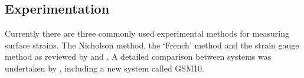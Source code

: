 \subsection{Experimentation}
Currently there are three commonly used experimental methods for measuring
surface strains. The Nicholson method, the `French' method and the strain
gauge method as reviewed by \cite{Murphy_2005}\cite{Yoshida_2002} and \cite{yang2005measurement}. A detailed comparison between systems was undertaken by \cite{kamarudin2014new}, including a new system called GSM10.  